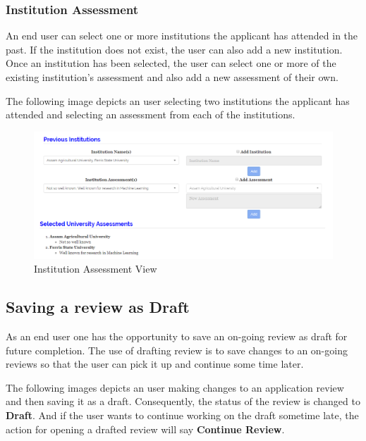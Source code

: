 \documentclass[fontsize=12pt,paper=letter,twoside]{scrartcl}
\begin{document}
\subsubsection{Institution Assessment}
An end user can select one or more institutions the applicant has attended in the past. If the institution does not exist, the user can also add a new institution. Once an institution has been selected, the user can select one or more of the existing institution's assessment and also add a new assessment of their own.

\bigskip
\noindent The following image depicts an user selecting two institutions the applicant has attended and selecting an assessment from each of the institutions.

\begin{figure}[!htb]
\begin{center}
\includegraphics[width=.7\textwidth]{images/uni_assessment.png}
\end{center}
\caption{Institution Assessment View}
\label{fig:uni_assessment}
\end{figure}

\clearpage
\newpage
\subsection{Saving a review as Draft}
As an end user one has the opportunity to save an on-going review as draft for future completion. The use of drafting review is to save changes to an on-going reviews so that the user can pick it up and continue some time later.

\bigskip
\noindent The following images depicts an user making changes to an application review and then saving it as a draft. Consequently, the status of the review is changed to \textbf{Draft}. And if the user wants to continue working on the draft sometime late, the action for opening a drafted review will say \textbf{Continue Review}.
\end{document}
